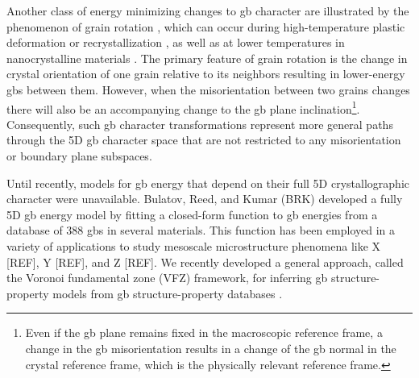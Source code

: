 \documentclass[final,twocolumn,12pt]{elsarticle}
\begin{document}
	Another class of energy minimizing changes to \gls{gb} character are illustrated by the phenomenon of grain rotation \cite{basakTwodimensionalStudyCoupled2014,bernsteinInfluenceGeometryGrain2008,fujitaDirectObservationSubgrainGrowth1961,huangGrainRotationLattice2015,sharmaObservationChangingCrystal2012,trauttCapillarydrivenGrainBoundary2014,ueharaAtomisticStudyGrain2008,upmanyuSimultaneousGrainBoundary2006,upmanyuSimultaneousGrainBoundary2006b,weissmannMechanismRecrystallizationAluminum1958}, which can occur during high-temperature plastic deformation \cite{ashbyApplicationBoundTheorems1978,gifkinsGrainboundarySlidingIts1976,herringDiffusionalViscosityPolycrystalline1950,leeStrainRateDependent1970,matsukiRelativeMotionGrains1977,nabarroSteadystateDiffusionalCreep1967,zelinGeometricalAspectsSuperplastic1996} or recrystallization \cite{liPossibilitySubgrainRotation1962}, as well as at lower temperatures in nanocrystalline materials \cite{wangGrainRotationMediated2014}. The primary feature of grain rotation is the change in crystal orientation of one grain relative to its neighbors resulting in lower-energy \glspl{gb} between them. However, when the misorientation between two grains changes there will also be an accompanying change to the \gls{gb} plane inclination\footnote{Even if the \gls{gb} plane remains fixed in the macroscopic reference frame, a change in the \gls{gb} misorientation results in a change of the \gls{gb} normal in the crystal reference frame, which is the physically relevant reference frame.}. Consequently, such \gls{gb} character transformations represent more general paths through the 5D \gls{gb} character space that are not restricted to any misorientation or boundary plane subspaces.
	
	Until recently, models for \gls{gb} energy that depend on their full 5D crystallographic character were unavailable. Bulatov, Reed, and Kumar (BRK) \cite{bulatovGrainBoundaryEnergy2014} developed a fully 5D \gls{gb} energy model by fitting a closed-form function to \gls{gb} energies from a database \cite{olmstedSurveyComputedGrain2009a} of 388 \glspl{gb} in several materials. This function has been employed in a variety of applications to study mesoscale microstructure phenomena like X [REF], Y [REF], and Z [REF]. We recently developed a general approach, called the Voronoi fundamental zone (VFZ) framework, for inferring \gls{gb} structure-property models from \gls{gb} structure-property databases \cite{bairdFiveDegreeoffreedomProperty2021}. 
	
\end{document}
